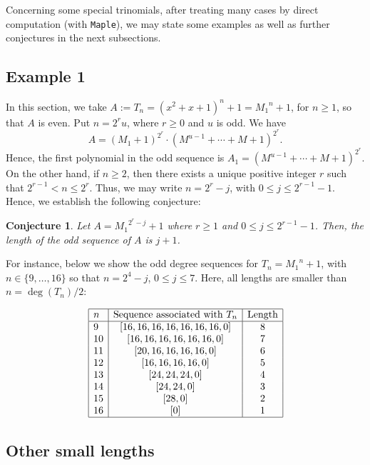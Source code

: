 \documentclass [12pt]{article}
\newtheorem{conjecture}[theorem]{Conjecture}
\begin{document}
Concerning some special trinomials, after treating many cases by direct computation (with {\tt Maple}), we may state some examples as well as further conjectures in the next subsections.

\subsection{Example 1} \label{exemple1}
In this section, we take $A :=T_n= (x^2+x+1)^n +1 = {M_1}^n +1$, for $n \geq 1$, so that $A$ is even. Put $n=2^r u$, where $r \geq 0$ and $u$ is odd. We have
$$A = (M_1+1)^{2^r} \cdot (M^{u-1}+\cdots+M+1)^{2^r}.$$  
Hence, the first polynomial in the odd sequence is $A_1 = (M^{u-1}+\cdots+M+1)^{2^r}$.\\
On the other hand, if $n \geq 2$, then there exists a unique positive integer $r$ such that $2^{r-1} < n \leq 2^r$. Thus, we may write $n = 2^r - j$, with $0 \leq j \leq 2^{r-1}-1$. \\

Hence, we establish the following conjecture:

\begin{conjecture} \label{conjectpartcase1}
Let $A = {M_1}^{2^r-j} +1$ where $r \geq 1$ and $0 \leq j \leq 2^{r-1}-1$. Then, the length of the odd sequence of $A$ is $j+1$.
\end{conjecture}

For instance, below we show the odd degree sequences for $T_n = {M_1}^n+1$, with $n \in \{9,\ldots,16\}$ so that $n = 2^4 -j$, $0 \leq j \leq 7$. Here, all lengths are smaller than $n=\deg(T_n)/2$:

$$\begin{array}{|l|c|c|}
\hline
n&\text{Sequence associated with $T_n$}&\text{Length}\\
\hline
9&[16, 16, 16, 16, 16, 16, 16, 0]&8\\
10&[16, 16, 16, 16, 16, 16, 0]&7\\
11&[20, 16, 16, 16, 16, 0]&6\\
12&[16, 16, 16, 16, 0]&5\\
13&[24, 24, 24, 0]&4\\
14&[24, 24, 0]&3\\
15&[28, 0]&2\\
16&[0]&1\\
\hline
\end{array}$$

\subsection{Other small lengths} \label{othersmall}
\end{document}
